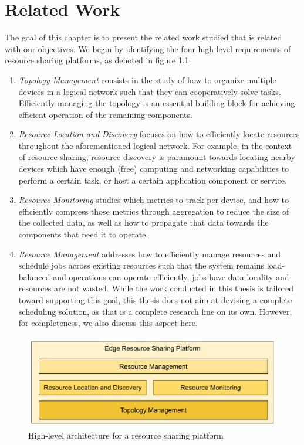 \chapter{Related Work} 
\label{cha:related_work}

The goal of this chapter is to present the related work studied that is related with our objectives. We begin by identifying the four high-level requirements of resource sharing platforms, as denoted in figure \ref{fig:proposed_architecture}:

\begin{enumerate}

    \item \textit{Topology Management} consists in the study of how to organize multiple devices in a logical network such that they can cooperatively solve tasks. Efficiently managing the topology is an essential building block for achieving efficient operation of the remaining components. 
    
    \item \textit{Resource Location and Discovery} focuses on how to efficiently locate resources throughout the aforementioned logical network. For example, in the context of resource sharing, resource discovery is paramount towards locating nearby devices which have enough (free) computing and networking capabilities to perform a certain task, or host a certain application component or service.
    
    \item \textit{Resource Monitoring} studies which metrics to track per device, and how to efficiently compress those metrics through aggregation to reduce the size of the collected data, as well as how to propagate that data towards the components that need it to operate.

    \item \textit{Resource Management} addresses how to efficiently manage resources and schedule jobs across existing resources such that the system remains load-balanced and operations can operate efficiently, jobs have data locality and resources are not wasted. While the work conducted in this thesis is tailored toward supporting this goal, this thesis does not aim at devising a complete scheduling solution, as that is a complete research line on its own. However, for completeness, we also discuss this aspect here.

\end{enumerate}

\begin{figure}
    \centering
    \includegraphics[width=0.8\linewidth]{Figures/proposed_architecture.pdf}
    \caption{High-level architecture for a resource sharing platform}
    \label{fig:proposed_architecture}
\end{figure}

